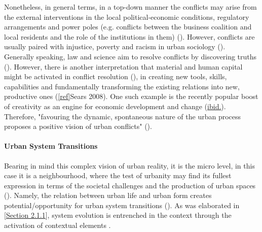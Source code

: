 \documentclass[11pt]{report}
\begin{document}
{{{{Nonetheless, in general terms, in a top-down manner the conflicts may arise from the external interventions in the local political-economic conditions, regulatory arrangements and power poles (e.g. conflicts between the business coalition and local residents and the role of the institutions in them) (\citealt{brenner_neoliberalism_2005}).
However, conflicts are usually paired with injustice, poverty and racism in urban sociology (\citealt{hubbard_revenge_2004}).
\\

Generally speaking, law and science aim to resolve conflicts by discovering truths (\citealt{brenner_neoliberalism_2005}).
However, there is another interpretation that material and human capital might be activated in conflict resolution (\href{Coleman}{\citealt{coleman_social_1988}}), in creating new tools, skills, capabilities and fundamentally transforming the existing relations into new, productive ones (\ref{ref}{Sears 2008}).
One such example is the recently popular boost of creativity as an engine for economic development and change (\href{Sears}{ibid.}).
Therefore, "favouring the dynamic, spontaneous nature of the urban process proposes a positive vision of urban conflicts" 
(\href{Sevilla-Buitrago}{\citealt{evilla-buitrago_debating_2013}}).

\paragraph{Urban System Transitions}

Bearing in mind this complex vision of urban reality, it is the micro level, in this case it is a neighbourhood, where the test of urbanity may find its fullest expression in terms of the societal challenges and the production of urban spaces (\href{Blotevogel}{\citealt{blotevogel_new_2008}}).
Namely, the relation between urban life and urban form creates potential/opportunity for urban system transitions (\href{Marcus}{\citealt{marcus_spatial_2007}}).
As was elaborated in [\href{Section 2.1.1}{Section 2.1.1}], system evolution is entrenched in the context through the activation of contextual elements .
\\

}}}}
\end{document}
